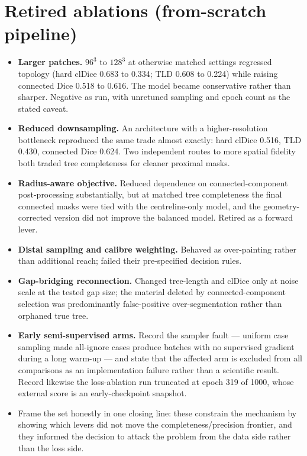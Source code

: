 \section{Retired ablations (from-scratch pipeline)}


\begin{itemize}
  \item \textbf{Larger patches.} $96^3$ to $128^3$ at otherwise matched settings regressed
  topology (hard clDice 0.683 to 0.334; TLD 0.608 to 0.224) while raising connected Dice
  0.518 to 0.616. The model became conservative rather than sharper. Negative as run, with
  unretuned sampling and epoch count as the stated caveat.
  \item \textbf{Reduced downsampling.} An architecture with a higher-resolution bottleneck
  reproduced the same trade almost exactly: hard clDice 0.516, TLD 0.430, connected Dice
  0.624. Two independent routes to more spatial fidelity both traded tree completeness for
  cleaner proximal masks.
  \item \textbf{Radius-aware objective.} Reduced dependence on connected-component
  post-processing substantially, but at matched tree completeness the final connected masks
  were tied with the centreline-only model, and the geometry-corrected version did not improve
  the balanced model. Retired as a forward lever.
  \item \textbf{Distal sampling and calibre weighting.} Behaved as over-painting rather than
  additional reach; failed their pre-specified decision rules.
  \item \textbf{Gap-bridging reconnection.} Changed tree-length and clDice only at noise scale
  at the tested gap size; the material deleted by connected-component selection was
  predominantly false-positive over-segmentation rather than orphaned true tree.
  \item \textbf{Early semi-supervised arms.} Record the sampler fault --- uniform case
  sampling made all-ignore cases produce batches with no supervised gradient during a long
  warm-up --- and state that the affected arm is excluded from all comparisons as an
  implementation failure rather than a scientific result. Record likewise the loss-ablation
  run truncated at epoch 319 of 1000, whose external score is an early-checkpoint snapshot.
  \item Frame the set honestly in one closing line: these constrain the mechanism by showing
  which levers did not move the completeness/precision frontier, and they informed the
  decision to attack the problem from the data side rather than the loss side.
\end{itemize}

